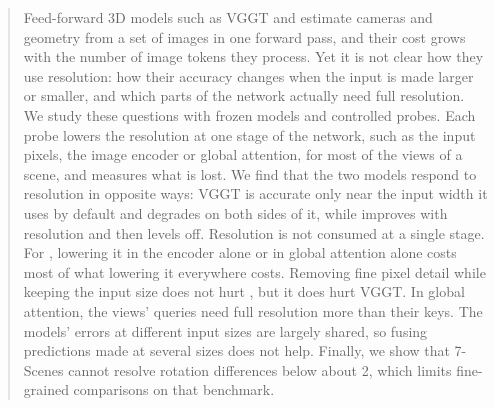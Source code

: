 \begin{abstract}
Feed-forward 3D models such as VGGT and \pithree estimate cameras and geometry from a set of images in one forward pass, and their cost grows with the number of image tokens they process. Yet it is not clear how they use resolution: how their accuracy changes when the input is made larger or smaller, and which parts of the network actually need full resolution. We study these questions with frozen models and controlled probes. Each probe lowers the resolution at one stage of the network, such as the input pixels, the image encoder or global attention, for most of the views of a scene, and measures what is lost. We find that the two models respond to resolution in opposite ways: VGGT is accurate only near the input width it uses by default and degrades on both sides of it, while \pithree improves with resolution and then levels off. Resolution is not consumed at a single stage. For \pithree, lowering it in the encoder alone or in global attention alone costs most of what lowering it everywhere costs. Removing fine pixel detail while keeping the input size does not hurt \pithree, but it does hurt VGGT. In global attention, the views' queries need full resolution more than their keys. The models' errors at different input sizes are largely shared, so fusing predictions made at several sizes does not help. Finally, we show that 7-Scenes cannot resolve rotation differences below about 2\textdegree, which limits fine-grained comparisons on that benchmark.
\end{abstract}

